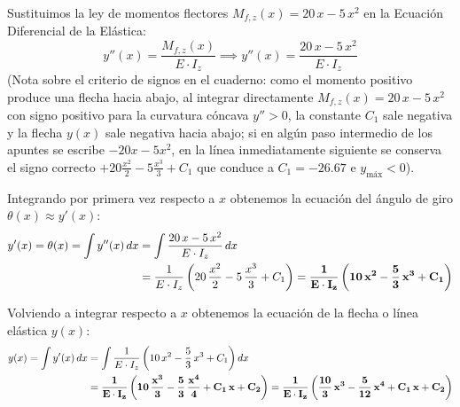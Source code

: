 {    

    Sustituimos la ley de momentos flectores $M_{f,z}(x) = 20\,x - 5\,x^2$ en la Ecuación Diferencial de la Elástica:
    \begin{equation}
        y''(x) = \frac{M_{f,z}(x)}{E \cdot I_z} \implies y''(x) = \frac{20\,x - 5\,x^2}{E \cdot I_z}
    \end{equation}
    (Nota sobre el criterio de signos en el cuaderno: como el momento positivo produce una flecha hacia abajo, al integrar directamente $M_{f,z}(x) = 20\,x - 5\,x^2$ con signo positivo para la curvatura cóncava $y'' > 0$, la constante $C_1$ sale negativa y la flecha $y(x)$ sale negativa hacia abajo; si en algún paso intermedio de los apuntes se escribe $-20x - 5x^2$, en la línea inmediatamente siguiente se conserva el signo correcto $+20\frac{x^2}{2} - 5\frac{x^3}{3} + C_1$ que conduce a $C_1 = -26.67$ e $y_{\text{máx}} < 0$).

    Integrando por primera vez respecto a $x$ obtenemos la ecuación del ángulo de giro $\theta(x) \approx y'(x)$:
    \begin{align}
        y'(x) = \theta(x) = \int y''(x) \, dx & = \int \frac{20\,x - 5\,x^2}{E \cdot I_z} \, dx \notag                                                            \\
                                              & = \frac{1}{E \cdot I_z} \left( 20\,\frac{x^2}{2} - 5\,\frac{x^3}{3} + C_1 \right) = \mathbf{\frac{1}{E \cdot I_z} \left( 10\,x^2 - \frac{5}{3}\,x^3 + C_1 \right)}
    \end{align}


    Volviendo a integrar respecto a $x$ obtenemos la ecuación de la flecha o línea elástica $y(x)$:
    \begin{align}
        y(x) = \int y'(x) \, dx & = \int \frac{1}{E \cdot I_z} \left( 10\,x^2 - \frac{5}{3}\,x^3 + C_1 \right) dx \notag \\
                                & = \mathbf{\frac{1}{E \cdot I_z} \left( 10\,\frac{x^3}{3} - \frac{5}{3}\,\frac{x^4}{4} + C_1\,x + C_2 \right) = \frac{1}{E \cdot I_z} \left( \frac{10}{3}\,x^3 - \frac{5}{12}\,x^4 + C_1\,x + C_2 \right)}
    \end{align}


}
